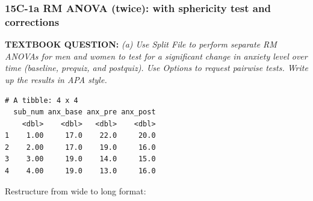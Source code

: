 \documentclass[]{article}
\newenvironment{Shaded}{\begin{snugshade}}{\end{snugshade}}
\newcommand{\KeywordTok}[1]{\textcolor[rgb]{0.13,0.29,0.53}{\textbf{#1}}}
\newcommand{\DataTypeTok}[1]{\textcolor[rgb]{0.13,0.29,0.53}{#1}}
\newcommand{\DecValTok}[1]{\textcolor[rgb]{0.00,0.00,0.81}{#1}}
\newcommand{\StringTok}[1]{\textcolor[rgb]{0.31,0.60,0.02}{#1}}
\newcommand{\CommentTok}[1]{\textcolor[rgb]{0.56,0.35,0.01}{\textit{#1}}}
\newcommand{\OperatorTok}[1]{\textcolor[rgb]{0.81,0.36,0.00}{\textbf{#1}}}
\newcommand{\NormalTok}[1]{#1}
\begin{document}
\subsubsection{15C-1a RM ANOVA (twice): with sphericity test and
corrections}\label{c-1a-rm-anova-twice-with-sphericity-test-and-corrections}

\textbf{TEXTBOOK QUESTION:} \emph{(a) Use Split File to perform separate
RM ANOVAs for men and women to test for a significant change in anxiety
level over time (baseline, prequiz, and postquiz). Use Options to
request pairwise tests. Write up the results in APA style.}

\begin{Shaded}
\end{Shaded}

\begin{verbatim}
# A tibble: 4 x 4
  sub_num anx_base anx_pre anx_post
    <dbl>    <dbl>   <dbl>    <dbl>
1    1.00     17.0    22.0     20.0
2    2.00     17.0    19.0     16.0
3    3.00     19.0    14.0     15.0
4    4.00     19.0    13.0     16.0
\end{verbatim}

Restructure from wide to long format:

\begin{Shaded}
\end{Shaded}
\end{document}
